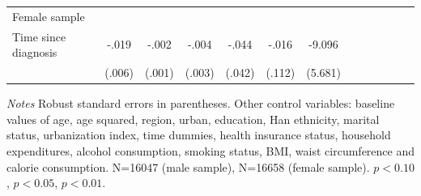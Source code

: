\begin{table}[!ht]
\begin{adjustbox}{max width=\linewidth}
\begin{threeparttable}
{\begin{tabular}{l*{6}{S
S}}
Female sample &&&&&&\\
Time since diagnosis&  -.019\sym{***}&    -.002         &    -.004         &    -.044         &    -.016         &   -9.096         \\
                &   (.006)         &   (.001)         &   (.003)         &   (.042)         &   (.112)         &  (5.681)         \\          
\bottomrule
\end{tabular}
\begin{tablenotes}
\item \textit{Notes}   Robust standard errors in parentheses.
Other control variables: baseline values of age, age squared, region, urban, education, Han ethnicity, marital status, urbanization index, time dummies, health insurance status, household expenditures, alcohol consumption, smoking status, BMI, waist circumference and calorie consumption. N=16047 (male sample), N=16658 (female sample). \sym{*} \(p<0.10\), \sym{**} \(p<0.05\), \sym{***} \(p<0.01\).
\end{tablenotes}
}
\end{threeparttable}
\end{adjustbox}
\end{table}

\clearpage

